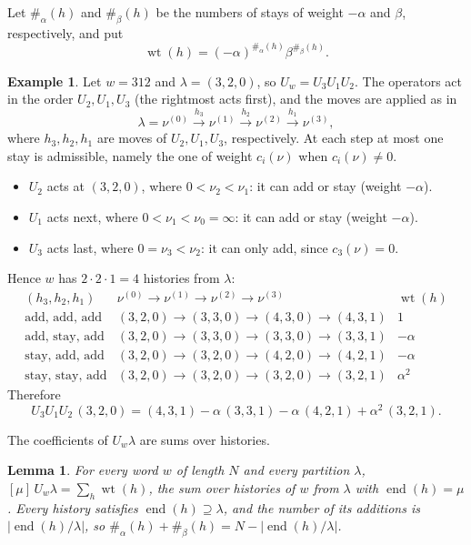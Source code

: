 \documentclass[11pt]{amsart}
\numberwithin{equation}{section}
\newtheorem{lemma}[theorem]{Lemma}
\theoremstyle{definition}
\newtheorem{example}[theorem]{Example}
\theoremstyle{remark}
\newcommand{\wt}{\operatorname{wt}}
\newcommand{\enD}{\operatorname{end}}
\begin{document}
Let $\#_\alpha(h)$ and $\#_\beta(h)$ be the numbers of stays of
weight $-\alpha$ and $\beta$, respectively, and put
\[
 \wt(h)=(-\alpha)^{\#_\alpha(h)}\beta^{\#_\beta(h)} .
\]
\begin{example}\label{ex:histories}
Let $w=312$ and $\lambda=(3,2,0)$, so $U_w=U_3U_1U_2$. The operators act in
the order $U_2,U_1,U_3$ (the rightmost acts first), and the moves are applied as in
\[
 \lambda=\nu^{(0)}\xrightarrow{h_3}\nu^{(1)}\xrightarrow{h_2}\nu^{(2)}\xrightarrow{h_1}\nu^{(3)},
\]
where $h_3,h_2,h_1$ are moves of $U_2,U_1,U_3$, respectively. At each step at most
one stay is admissible, namely the one of weight $c_i(\nu)$ when $c_i(\nu)\neq0$.
\begin{itemize}
\item $U_2$ acts at $(3,2,0)$, where $0<\nu_2<\nu_1$: it can add or stay (weight $-\alpha$).
\item $U_1$ acts next, where $0<\nu_1<\nu_0=\infty$: it can add or stay (weight $-\alpha$).
\item $U_3$ acts last, where $0=\nu_3<\nu_2$: it can only add, since $c_3(\nu)=0$.
\end{itemize}
Hence $w$ has $2\cdot2\cdot1=4$ histories from $\lambda$:
\[
\renewcommand{\arraystretch}{1.2}
\begin{array}{lll}
(h_3,h_2,h_1) & \nu^{(0)}\to\nu^{(1)}\to\nu^{(2)}\to\nu^{(3)} & \wt(h)\\ \hline
\text{add, add, add} & (3,2,0)\to(3,3,0)\to(4,3,0)\to(4,3,1) & 1\\
\text{add, stay, add} & (3,2,0)\to(3,3,0)\to(3,3,0)\to(3,3,1) & -\alpha\\
\text{stay, add, add} & (3,2,0)\to(3,2,0)\to(4,2,0)\to(4,2,1) & -\alpha\\
\text{stay, stay, add} & (3,2,0)\to(3,2,0)\to(3,2,0)\to(3,2,1) & \alpha^2
\end{array}
\]
Therefore
\[
U_3U_1U_2\,(3,2,0)=(4,3,1)-\alpha\,(3,3,1)-\alpha\,(4,2,1)+\alpha^2\,(3,2,1).
\]
\end{example}

The coefficients of $U_w\lambda$ are sums over histories.

\begin{lemma}\label{lem:histories}
For every word $w$ of length $N$ and every partition $\lambda$,
$[\mu]\,U_w\lambda=\sum_h\wt(h)$, the sum over histories of $w$ from $\lambda$
with $\enD(h)=\mu$. Every history satisfies $\enD(h)\supseteq\lambda$, and the
number of its additions is $|\enD(h)/\lambda|$, so
$\#_\alpha(h)+\#_\beta(h)=N-|\enD(h)/\lambda|$.
\end{lemma}
\end{document}
